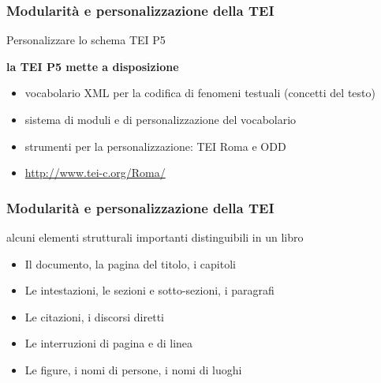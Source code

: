     \begin{frame}
        \frametitle{Modularità e personalizzazione della TEI}
        \addtocounter{nframe}{1}
        
    
        \begin{block}{Personalizzare lo schema TEI P5}
            
            \textbf{la TEI P5 mette a disposizione}
                \begin{itemize}
                    \item vocabolario XML per la codifica di fenomeni testuali (concetti del testo)
                    \item sistema di moduli e di personalizzazione del vocabolario
                    \item strumenti per la personalizzazione: TEI Roma e ODD
                    \item [] \url{http://www.tei-c.org/Roma/}
                \end{itemize} 
        \end{block}
        
    \end{frame}

    \begin{frame}
        \frametitle{Modularità e personalizzazione della TEI}
        \addtocounter{nframe}{1}

        \begin{block}{alcuni elementi strutturali importanti distinguibili in un libro}
                \begin{itemize}
                    \item Il documento, la pagina del titolo, i capitoli
                    \item Le intestazioni, le sezioni e sotto-sezioni, i paragrafi
                    \item Le citazioni, i discorsi diretti
                    \item Le interruzioni di pagina e di linea
                    \item Le figure, i nomi di persone, i nomi di luoghi
                \end{itemize} 
        \end{block}
        
    \end{frame}


